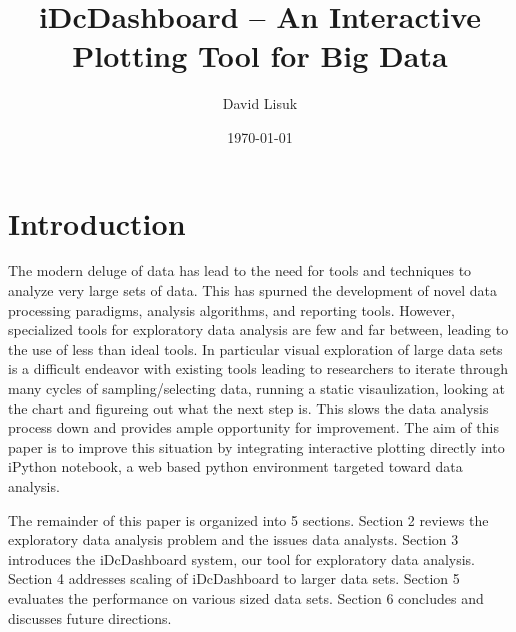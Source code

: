 \documentclass[letter,twocolumn]{article}
\title{iDcDashboard -- An Interactive Plotting Tool for Big Data}
\author{David Lisuk}
\date{\today}
\begin{document}


\section{Introduction}%

The modern deluge of data has lead to the need for tools and techniques to analyze very large sets of data.
This has spurned the development of novel data processing paradigms\cite{dean2008mapreduce}\cite{zaharia2010spark}, analysis algorithms, and reporting tools.
However, specialized tools for exploratory data analysis are few and far between, leading to the use of less than ideal tools.
In particular visual exploration of large data sets is a difficult endeavor with existing tools leading to researchers to iterate through many cycles of sampling/selecting data, running a static visaulization, looking at the chart and figureing out what the next step is.
This slows the data analysis process down and provides ample opportunity for improvement.
The aim of this paper is to improve this situation by integrating interactive plotting directly into iPython notebook\cite{perez2013open}, a web based python environment targeted toward data analysis.

The remainder of this paper is organized into 5 sections.
Section 2 reviews the exploratory data analysis problem and the issues data analysts.
Section 3 introduces the iDcDashboard system, our tool for exploratory data analysis.
Section 4 addresses scaling of iDcDashboard to larger data sets.
Section 5 evaluates the performance on various sized data sets.
Section 6 concludes and discusses future directions.
\end{document}
